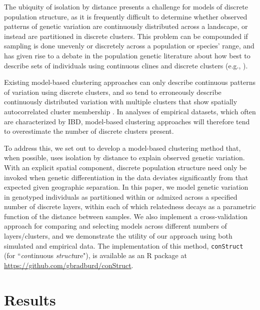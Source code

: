 \documentclass[10pt,letterpaper]{article}
\begin{document}
The ubiquity of isolation by distance presents a challenge for models of discrete population structure,
as it is frequently difficult to determine whether observed patterns of genetic variation are 
continuously distributed across a landscape, or instead are partitioned in discrete clusters.
This problem can be compounded if sampling is done unevenly or discretely across a population or species' range,
and has given rise to a debate in the population genetic literature
about how best to describe sets of individuals using continuous clines and discrete clusters 
(e.g., \cite{SerrePaabo2004,rosenberg2005clines}).

Existing model-based clustering approaches can only describe continuous patterns of variation using
discrete clusters, and so tend to erroneously describe continuously distributed variation with multiple clusters that 
show spatially autocorrelated cluster membership \cite{Frantz2009,meirmans2012}.
In analyses of empirical datasets, which often are characterized by IBD,
model-based clustering approaches will therefore tend to overestimate
the number of discrete clusters present. 

To address this, we set out to develop
a model-based clustering method that, when possible, uses isolation by distance 
to explain observed genetic variation.
With an explicit spatial component, discrete population structure need only be invoked when genetic differentiation 
in the data deviates significantly from that expected given geographic separation.
In this paper, 
we model genetic variation in genotyped individuals as 
partitioned within or admixed across a specified number of discrete layers,
within each of which relatedness decays as a parametric function of the distance between samples.
We also implement a cross-validation approach for comparing and selecting models across different numbers of layers/clusters,
and we demonstrate the utility of our approach using both simulated and empirical data.
The implementation of this method, \texttt{conStruct} (for ``\emph{con}tinuous \emph{struct}ure"), 
is available as an R package at 
\href{https://github.com/gbradburd/conStruct}{https://github.com/gbradburd/conStruct}.

\section*{Results}
\end{document}

